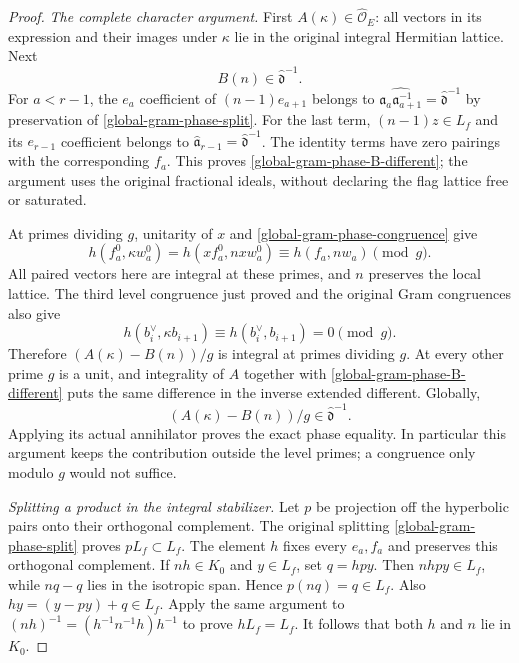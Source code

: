 \begin{proof}
\emph{The complete character argument.}
First $A(\kappa)\in\widehat{\mathcal O}_E$: all vectors in
its expression and their images under $\kappa$ lie in the
original integral Hermitian lattice.  Next
\begin{equation}\label{global-gram-phase-B-different}
                         B(n)\in\widehat{\mathfrak d}^{-1}.
\end{equation}
For $a<r-1$, the $e_a$ coefficient of $(n-1)e_{a+1}$ belongs
to $\widehat{\mathfrak a_a\mathfrak a_{a+1}^{-1}}
=\widehat{\mathfrak d}^{-1}$ by preservation of
\eqref{global-gram-phase-split}.  For the last term,
$(n-1)z\in L_f$ and its $e_{r-1}$ coefficient belongs to
$\widehat{\mathfrak a}_{r-1}=\widehat{\mathfrak d}^{-1}$.
The identity terms have zero pairings with the corresponding
$f_a$.  This proves \eqref{global-gram-phase-B-different}; the
argument uses the original fractional ideals, without declaring
the flag lattice free or saturated.

At primes dividing $g$, unitarity of $x$ and
\eqref{global-gram-phase-congruence} give
\[
 h(f_a^0,\kappa w_a^0)=h(xf_a^0,nxw_a^0)
                         \equiv h(f_a,nw_a)\pmod{g}.
\]
All paired vectors here are integral at these primes, and $n$
preserves the local lattice.  The third level congruence just
proved and the original Gram congruences also give
\[
 h(b_i^\vee,\kappa b_{i+1})
 \equiv h(b_i^\vee,b_{i+1})=0\pmod{g}.
\]
Therefore $(A(\kappa)-B(n))/g$ is integral at primes dividing
$g$.  At every other prime $g$ is a unit, and integrality of
$A$ together with \eqref{global-gram-phase-B-different} puts
the same difference in the inverse extended different.  Globally,
\[
          (A(\kappa)-B(n))/g\in\widehat{\mathfrak d}^{-1}.
\]
Applying its actual annihilator proves the exact phase equality.
In particular this argument keeps the contribution outside the
level primes; a congruence only modulo $g$ would not suffice.

\emph{Splitting a product in the integral stabilizer.}
Let $p$ be projection off the hyperbolic pairs onto their
orthogonal complement.  The original splitting
\eqref{global-gram-phase-split} proves $pL_f\subset L_f$.
The element $h$ fixes every $e_a,f_a$ and preserves this
orthogonal complement.  If $nh\in K_0$ and $y\in L_f$, set
$q=hpy$.  Then $nhpy\in L_f$, while $nq-q$ lies in the
isotropic span.  Hence $p(nq)=q\in L_f$.  Also
$hy=(y-py)+q\in L_f$.  Apply the same argument to
$(nh)^{-1}=(h^{-1}n^{-1}h)h^{-1}$ to prove $hL_f=L_f$.
It follows that both $h$ and $n$ lie in $K_0$.


\end{proof}
